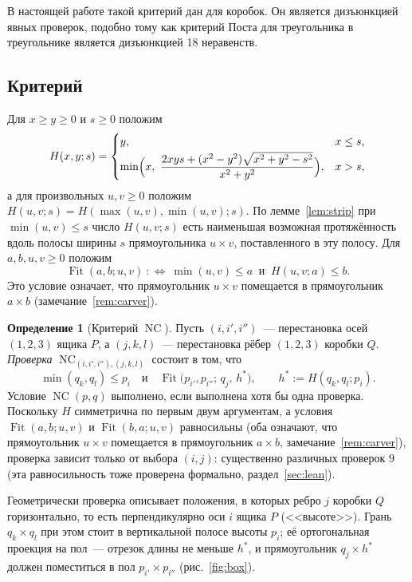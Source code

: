 \documentclass[11pt]{article}
\theoremstyle{definition}
\newtheorem{definition}[theorem]{Определение}
\theoremstyle{remark}
\newcommand{\Fit}{\operatorname{Fit}}
\newcommand{\NC}{\operatorname{NC}}
\begin{document}
В настоящей работе такой критерий дан для коробок. Он является дизъюнкцией явных проверок, подобно
тому как критерий Поста для треугольника в треугольнике \cite{Post1993} является дизъюнкцией 18
неравенств.

\subsection*{Критерий}
Для $x\ge y\ge0$ и $s\ge 0$ положим
\begin{equation}\label{eq:H}
H(x,y;s)=\begin{cases}
y, & x\le s,\\[2pt]
\min\Bigl(x,\ \dfrac{2xys+(x^2-y^2)\sqrt{x^2+y^2-s^2}}{x^2+y^2}\Bigr), & x>s,
\end{cases}
\end{equation}
а для произвольных $u,v\ge0$ положим $H(u,v;s)=H(\max(u,v),\min(u,v);s)$. По
лемме~\ref{lem:strip} при $\min(u,v)\le s$ число $H(u,v;s)$ есть наименьшая возможная
протяжённость вдоль полосы ширины $s$ прямоугольника $u\times v$, поставленного в эту полосу. Для
$a,b,u,v\ge 0$ положим
\[
\Fit(a,b;u,v)\ :\Longleftrightarrow\ \min(u,v)\le a\ \text{ и }\ H(u,v;a)\le b .
\]
Это условие означает, что прямоугольник $u\times v$ помещается в прямоугольник $a\times b$
(замечание~\ref{rem:carver}).

\begin{definition}[Критерий $\NC$]\label{def:NC}
Пусть $(i,i',i'')$~--- перестановка осей $(1,2,3)$ ящика $P$, а $(j,k,l)$~--- перестановка рёбер
$(1,2,3)$ коробки $Q$. \emph{Проверка} $\NC_{(i,i',i''),(j,k,l)}$ состоит в том, что
\[
\min(q_k,q_l)\le p_i\quad\text{и}\quad \Fit\bigl(p_{i'},p_{i''};\,q_j,\,h^*\bigr),\qquad
h^*:=H(q_k,q_l;p_i).
\]
Условие $\NC(p,q)$ выполнено, если выполнена хотя бы одна проверка. Поскольку $H$ симметрична по
первым двум аргументам, а условия $\Fit(a,b;u,v)$ и $\Fit(b,a;u,v)$ равносильны (оба означают,
что прямоугольник $u\times v$ помещается в прямоугольник $a\times b$, замечание~\ref{rem:carver}),
проверка зависит только от выбора $(i,j)$: существенно различных проверок $9$ (эта равносильность
тоже проверена формально, раздел~\ref{sec:lean}).
\end{definition}

Геометрически проверка описывает положения, в которых ребро $j$ коробки $Q$ горизонтально, то есть
перпендикулярно оси $i$ ящика $P$ (<<высоте>>). Грань $q_k\times q_l$ при этом стоит в вертикальной
полосе высоты $p_i$; её ортогональная проекция на пол~--- отрезок длины не меньше $h^*$, и прямоугольник
$q_j\times h^*$ должен поместиться в пол $p_{i'}\times p_{i''}$ (рис.~\ref{fig:box}).
\end{document}
